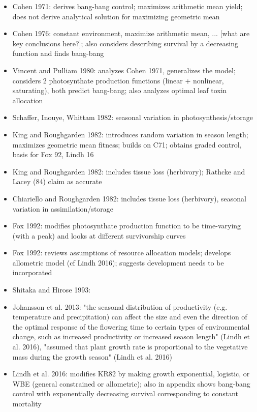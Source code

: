 \documentclass[12pt, oneside]{article}   	%
\begin{document}
\begin{itemize}

\item Cohen 1971: derives bang-bang control; maximizes arithmetic mean yield; does not derive analytical solution for maximizing geometric mean
\item Cohen 1976: constant environment, maximize arithmetic mean, ... [what are key conclusions here?]; also considers describing survival by a decreasing function and finds bang-bang
\item Vincent and Pulliam 1980: analyzes Cohen 1971, generalizes the model; considers 2 photosynthate production functions (linear + nonlinear, saturating), both predict bang-bang; also analyzes optimal leaf toxin allocation
\item Schaffer, Inouye, Whittam 1982: seasonal variation in photosynthesis/storage
\item King and Roughgarden 1982: introduces random variation in season length; maximizes geometric mean fitness; builds on C71; obtains graded control, basis for Fox 92, Lindh 16
\item King and Roughgarden 1982: includes tissue loss (herbivory); Rathcke and Lacey (84) claim as accurate
\item Chiariello and Roughgarden 1982: includes tissue loss (herbivory), seasonal variation in assimilation/storage
\item Fox 1992: modifies photosynthate production function to be time-varying (with a peak) and looks at different survivorship curves
\item Fox 1992: reviews assumptions of resource allocation models; develops allometric model (cf Lindh 2016); suggests development needs to be incorporated
\item Shitaka and Hirose 1993:
\item Johansson et al. 2013: "the seasonal distribution of productivity (e.g. temperature and precipitation) can affect the size and even the direction of the optimal response of the flowering time to certain types of environmental change, such as increased productivity or increased season length" (Lindh et al. 2016), "assumed that plant growth rate is proportional to the vegetative mass during the growth season" (Lindh et al. 2016)
\item Lindh et al. 2016: modifies KR82 by making growth exponential, logistic, or WBE (general constrained or allometric); also in appendix shows bang-bang control with exponentially decreasing survival corresponding to constant mortality

\end{itemize}
\end{document}
